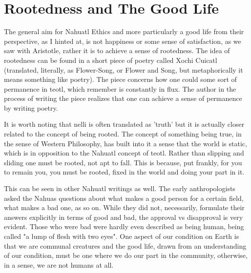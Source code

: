 \section{Rootedness and The Good Life}

The general aim for Nahuatl Ethics and more particularly a good life from their perspective, as I hinted at, is not happiness or some sense of satisfaction, as we saw with Aristotle, rather it is to achieve a sense of rootedness. The idea of rootedness can be found in a short piece of poetry called Xochi Cuicatl (translated, literally, as Flower-Song, or Flower and Song, but metaphorically it means something like poetry). The piece concerns how one could some sort of permanence in teotl,  which remember is constantly in flux. The author in the process of writing the piece realizes that one can achieve a sense of permanence by writing poetry. 

It is worth noting that nelli is often translated as 'truth' but it is actually closer related to the concept of being rooted. The concept of something being true, in the sense of Western Philosophy, has built into it a sense that the world is static, which is in opposition to the Nahuatl concept of teotl. Rather than slipping and sliding one must be rooted, not apt to fall. This is because, put frankly, for you to remain you, you must be rooted, fixed in the world and doing your part in it. 

This can be seen in other Nahuatl writings as well. The early anthropologists asked the Nahuas questions about what makes a good person for a certain field, what makes a bad one, as so on. While they did not, necessarily, formulate their answers explicitly in terms of good and bad, the approval vs disapproval is very evident. Those who were bad were hardly even described as being human, being called "a lump of flesh with two eyes".  One aspect of our condition on Earth is that we are communal creatures and the good life, drawn from an understanding of our condition, must be one where we do our part in the community, otherwise, in a sense, we are not humans at all. 

